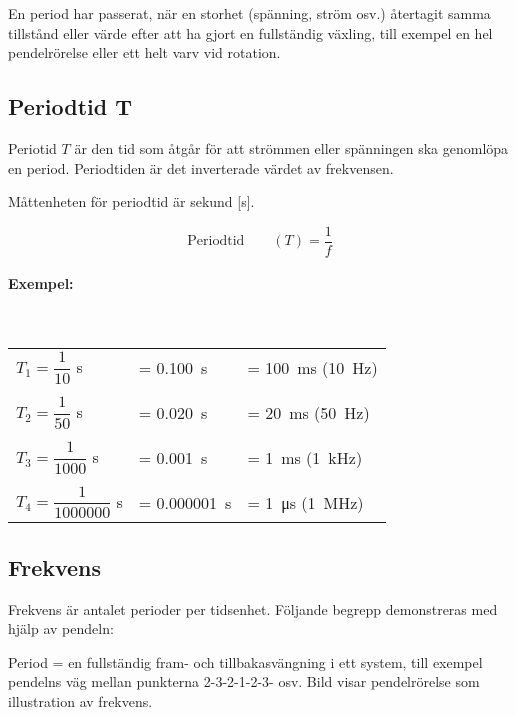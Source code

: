 En period har passerat, när en storhet (spänning, ström osv.) återtagit samma
tillstånd eller värde efter att ha gjort en fullständig växling, till exempel en hel
pendelrörelse eller ett helt varv vid rotation.

\subsection{Periodtid T}

Periotid \(T\) är den tid som åtgår för att strömmen eller spänningen ska
genomlöpa en period. Periodtiden är det inverterade värdet av frekvensen.

Måttenheten för periodtid är sekund [s].

$$\text{Periodtid} \qquad (T) = \dfrac{1}{f}$$

\noindent
\paragraph{Exempel:}~\\[1ex]
\begin{small}
\begin{tabular}{@{}lll}
\(T_1=\dfrac{1}{10}\) s & = \SI{0,100}{\second} & = \SI{100}{\milli\second} (\SI{10}{\hertz})\\
\\
\(T_2=\dfrac{1}{50}\) s & = \SI{0,020}{\second} & = \SI{20}{\milli\second} (\SI{50}{\hertz})\\
\\
\(T_3=\dfrac{1}{1000}\) s & = \SI{0,001}{\second} & = \SI{1}{\milli\second} (\SI{1}{\kilo\hertz})\\
\\
\(T_4=\dfrac{1}{1000000}\) s & = \SI{0,000001}{\second} & = \SI{1}{\micro\second} (\SI{1}{\mega\hertz})\\
\end{tabular}
\end{small}

\subsection{Frekvens}
\label{frekvens}

Frekvens är antalet perioder per tidsenhet.
Följande begrepp demonstreras med hjälp av pendeln:

Period = en fullständig fram- och tillbakasvängning i ett system, till exempel
pendelns väg mellan punkterna 2-3-2-1-2-3- osv. Bild  visar
pendelrörelse som illustration av frekvens.


